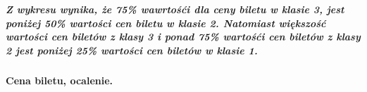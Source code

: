 \documentclass[11pt]{article}
\begin{document}
    \begin{center}
    \end{center}
    { \hspace*{\fill} \\}
    
    \subparagraph{Z wykresu wynika, że 75\% wawrtośći dla ceny biletu w
klasie 3, jest poniżej 50\% wartości cen biletu w klasie 2. Natomiast
większość wartości cen biletów z klasy 3 i ponad 75\% wartośći cen
biletów z klasy 2 jest poniżej 25\% wartości cen biletów w klasie
1.}\label{z-wykresu-wynika-ux17ce-75-wawrtoux15bux107i-dla-ceny-biletu-w-klasie-3-jest-poniux17cej-50-wartoux15bci-cen-biletu-w-klasie-2.-natomiast-wiux119kszoux15bux107-wartoux15bci-cen-biletuxf3w-z-klasy-3-i-ponad-75-wartoux15bux107i-cen-biletuxf3w-z-klasy-2-jest-poniux17cej-25-wartoux15bci-cen-biletuxf3w-w-klasie-1.}

    \paragraph{Cena biletu, ocalenie.}\label{cena-biletu-ocalenie.}
\end{document}
